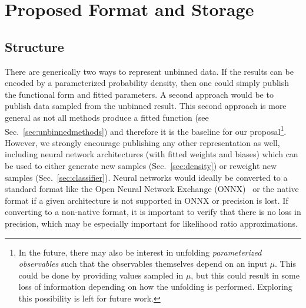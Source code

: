 \documentclass[a4paper,11pt]{article}
\begin{document}
\section{Proposed Format and Storage}
\label{sec:formatandstorage}

\subsection{Structure}

There are generically two ways to represent unbinned data.  If the results can be encoded by a parameterized probability density, then one could simply publish the functional form and fitted parameters.  A second approach would be to publish data sampled from the unbinned result.  This second approach is more general as not all methods produce a fitted function (see Sec.~\ref{sec:unbinnedmethods}) and therefore it is the baseline for our proposal\footnote{In the future, there may also be interest in unfolding \textit{parameterized observables} such that the observables themselves depend on an input $\mu$.  This could be done by providing values sampled in $\mu$, but this could result in some loss of information depending on how the unfolding is performed.  Exploring this possibility is left for future work.}.  However, we strongly encourage publishing any other representation as well, including neural network architectures (with fitted weights and biases) which can be used to either generate new samples (Sec.~\ref{sec:density}) or reweight new samples (Sec.~\ref{sec:classifier}).  Neural networks would ideally be converted to a standard format like the Open Neural Network Exchange (ONNX)~\cite{bai2019} or the native format if a given architecture is not supported in ONNX or precision is lost.  If converting to a non-native format, it is important to verify that there is no loss in precision, which may be especially important for likelihood ratio approximations.
\end{document}
